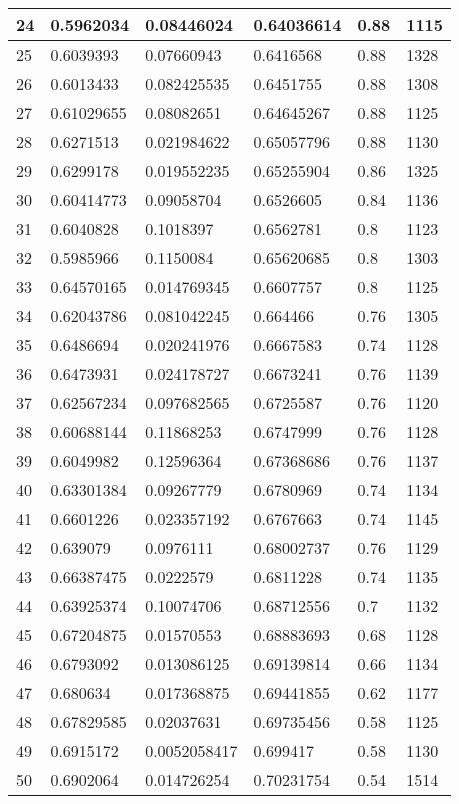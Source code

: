 \begin{longtable}{|l|l|l|l|l|l|}
24 & 0.5962034 & 0.08446024 & 0.64036614 & 0.88 & 1115 \\ \hline 
25 & 0.6039393 & 0.07660943 & 0.6416568 & 0.88 & 1328 \\ \hline 
26 & 0.6013433 & 0.082425535 & 0.6451755 & 0.88 & 1308 \\ \hline 
27 & 0.61029655 & 0.08082651 & 0.64645267 & 0.88 & 1125 \\ \hline 
28 & 0.6271513 & 0.021984622 & 0.65057796 & 0.88 & 1130 \\ \hline 
29 & 0.6299178 & 0.019552235 & 0.65255904 & 0.86 & 1325 \\ \hline 
30 & 0.60414773 & 0.09058704 & 0.6526605 & 0.84 & 1136 \\ \hline 
31 & 0.6040828 & 0.1018397 & 0.6562781 & 0.8 & 1123 \\ \hline 
32 & 0.5985966 & 0.1150084 & 0.65620685 & 0.8 & 1303 \\ \hline 
33 & 0.64570165 & 0.014769345 & 0.6607757 & 0.8 & 1125 \\ \hline 
34 & 0.62043786 & 0.081042245 & 0.664466 & 0.76 & 1305 \\ \hline 
35 & 0.6486694 & 0.020241976 & 0.6667583 & 0.74 & 1128 \\ \hline 
36 & 0.6473931 & 0.024178727 & 0.6673241 & 0.76 & 1139 \\ \hline 
37 & 0.62567234 & 0.097682565 & 0.6725587 & 0.76 & 1120 \\ \hline 
38 & 0.60688144 & 0.11868253 & 0.6747999 & 0.76 & 1128 \\ \hline 
39 & 0.6049982 & 0.12596364 & 0.67368686 & 0.76 & 1137 \\ \hline 
40 & 0.63301384 & 0.09267779 & 0.6780969 & 0.74 & 1134 \\ \hline 
41 & 0.6601226 & 0.023357192 & 0.6767663 & 0.74 & 1145 \\ \hline 
42 & 0.639079 & 0.0976111 & 0.68002737 & 0.76 & 1129 \\ \hline 
43 & 0.66387475 & 0.0222579 & 0.6811228 & 0.74 & 1135 \\ \hline 
44 & 0.63925374 & 0.10074706 & 0.68712556 & 0.7 & 1132 \\ \hline 
45 & 0.67204875 & 0.01570553 & 0.68883693 & 0.68 & 1128 \\ \hline 
46 & 0.6793092 & 0.013086125 & 0.69139814 & 0.66 & 1134 \\ \hline 
47 & 0.680634 & 0.017368875 & 0.69441855 & 0.62 & 1177 \\ \hline 
48 & 0.67829585 & 0.02037631 & 0.69735456 & 0.58 & 1125 \\ \hline 
49 & 0.6915172 & 0.0052058417 & 0.699417 & 0.58 & 1130 \\ \hline 
50 & 0.6902064 & 0.014726254 & 0.70231754 & 0.54 & 1514 \\ \hline 
\end{longtable}